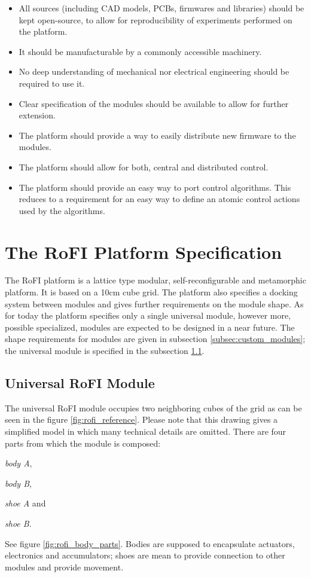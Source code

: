 \begin{itemize}
    \item All sources (including CAD models, PCBs, firmwares and libraries)
    should be kept open-source, to allow for reproducibility of experiments
    performed on the platform.
    \item It should be manufacturable by a commonly accessible machinery.
    \item No deep understanding of mechanical nor electrical engineering should
    be required to use it.
    \item Clear specification of the modules should be available to allow for
    further extension.
    \item The platform should provide a way to easily distribute new firmware to
    the modules.
    \item The platform should allow for both, central and distributed control.
    \item The platform should provide an easy way to port control algorithms.
    This reduces to a requirement for an easy way to define an atomic control
    actions used by the algorithms.
\end{itemize}

\section{The RoFI Platform Specification}

The RoFI platform is a lattice type modular, self-reconfigurable and metamorphic
platform. It is based on a 10cm cube grid. The platform also specifies a
docking system between modules and gives further requirements on the module
shape. As for today the platform specifies only a single universal module,
however more, possible specialized, modules are expected to be designed in a
near future. The shape requirements for modules are given in subsection
\ref{subsec:custom_modules}; the universal module is specified in the subsection
\ref{subsec:universal_module}.

\subsection{Universal RoFI Module}\label{subsec:universal_module}

The universal RoFI module occupies two neighboring cubes of the grid as can be
seen in the figure \ref{fig:rofi_reference}. Please note that this drawing gives
a simplified model in which many technical details are omitted. There are four
parts from which the module is composed:
\begin{enumerate*}
    \item \emph{body A},
    \item \emph{body B},
    \item \emph{shoe A} and
    \item \emph{shoe B}.
\end{enumerate*}
See figure \ref{fig:rofi_body_parts}. Bodies are supposed to encapsulate
actuators, electronics and accumulators; shoes are mean to provide connection to
other modules and provide movement.

